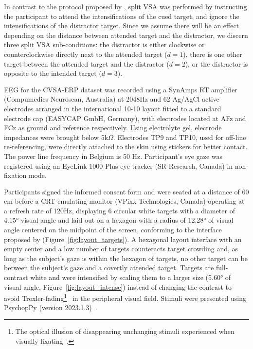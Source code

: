 In contrast to the protocol proposed by \cite{Frenzel2011}, split VSA was
performed by instructing the participant to attend the intensifications of the
cued target, and ignore the intensifications of the distractor target.
Since we assume there will be an effect depending on the distance between
attended target and the distractor, we discern three split VSA sub-conditions:
the distractor is either clockwise or counterclockwise directly next to the
attended target ($d=1$), there is one other target between the attended target and
the distractor ($d=2$), or the distractor is opposite to the intended target
($d=3$).

EEG for the CVSA-ERP dataset was recorded using a SynAmps RT amplifier
(Compumedics Neuroscan, Australia) at 2048Hz and 62 Ag/AgCl active electrodes arranged in the
international 10-10 layout fitted to a standard electrode cap (EASYCAP GmbH,
Germany), with electrodes located at AFz and FCz as ground and reference respectively.
Using electrolyte gel, electrode impedances were brought below 5k$\Omega$.
Electrodes TP9 and TP10, used for off-line re-referencing, were directly
attached to the skin using stickers for better contact.
The power line frequency in Belgium is 50 Hz.
Participant's eye gaze was registered using an EyeLink 1000 Plus eye tracker (SR Research,
Canada) in non-fixation mode.

Participants signed the informed consent form and were seated at a distance of
60 cm before a CRT-emulating monitor (VPixx
Technologies, Canada) operating at a refresh rate of 120Hz, displaying 6
circular white targets with a diameter of 4.15° visual angle and laid out on a hexagon
with a radius of 12.28° of visual angle centered on the midpoint of the screen,
conforming to the interface proposed by \textcite{Treder2010}
(Figure~\ref{fig:layout_targets}).
A hexagonal layout interface with an empty center and a low number of targets
counteracts target crowding and, as long as the subject’s gaze is within the hexagon of
targets, no other target can be between the subject’s gaze and a covertly
attended target.
Targets are full-contrast white and were intensified by scaling them to a
larger size (5.60° of visual angle, Figure~\ref{fig:layout_intense}) instead of changing the contrast to avoid Troxler-fading\footnote{The optical illusion of disappearing unchanging stimuli
experienced when visually fixating~\cite{Troxler1804}.}~\cite{Treder2010} in the
peripheral visual field.
Stimuli were presented using PsychopPy (version 2023.1.3)~\cite{Peirce2019}.

